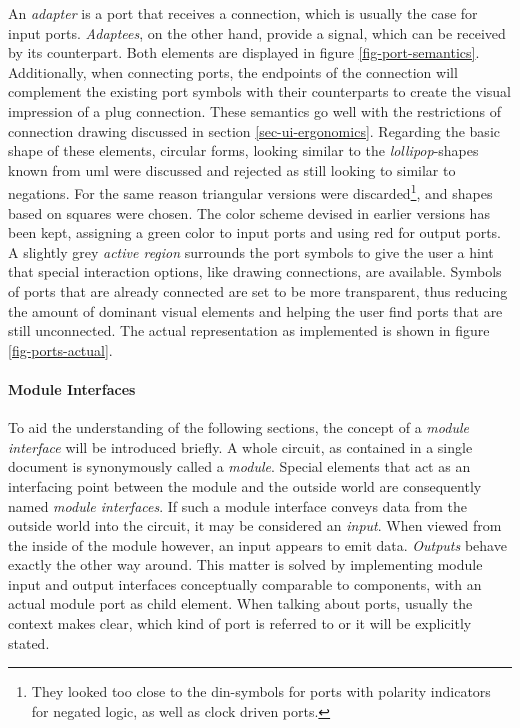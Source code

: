 		An \emph{adapter} is a port that receives a connection, which is usually the case for input ports.
		\emph{Adaptees}, on the other hand, provide a signal, which can be received by its counterpart.
		Both elements are displayed in figure \ref{fig-port-semantics}.
		Additionally, when connecting ports, the endpoints of the connection will complement the existing port symbols with their counterparts to create the visual impression of a plug connection.
		These semantics go well with the restrictions of connection drawing discussed in section \ref{sec-ui-ergonomics}.
		Regarding the basic shape of these elements, circular forms, looking similar to the \emph{lollipop}-shapes known from \gls{uml} were discussed and rejected as still looking to similar to negations.
		For the same reason triangular versions were discarded\footnote{
			They looked too close to the \gls{din}-symbols for ports with polarity indicators for negated logic, as well as clock driven ports.
		}, and shapes based on squares were chosen.
		The color scheme devised in earlier versions has been kept, assigning a green color to input ports and using red for output ports.
		A slightly grey \emph{active region} surrounds the port symbols to give the user a hint that special interaction options, like drawing connections, are available.
		Symbols of ports that are already connected are set to be more transparent, thus reducing the amount of dominant visual elements and helping the user find ports that are still unconnected.
		The actual representation as implemented is shown in figure \ref{fig-ports-actual}.

	\paragraph{Module Interfaces}
	To aid the understanding of the following sections, the concept of a \emph{module interface} will be introduced briefly.
	A whole circuit, as contained in a single document is synonymously called a \emph{module}.
	Special elements that act as an interfacing point between the module and the outside world are consequently named \emph{module interfaces}.
	If such a module interface conveys data from the outside world into the circuit, it may be considered an \emph{input}.
	When viewed from the inside of the module however, an input appears to emit data.
	\emph{Outputs} behave exactly the other way around.
	This matter is solved by implementing module input and output interfaces conceptually comparable to components, with an actual module port as child element.
	When talking about ports, usually the context makes clear, which kind of port is referred to or it will be explicitly stated. 	

